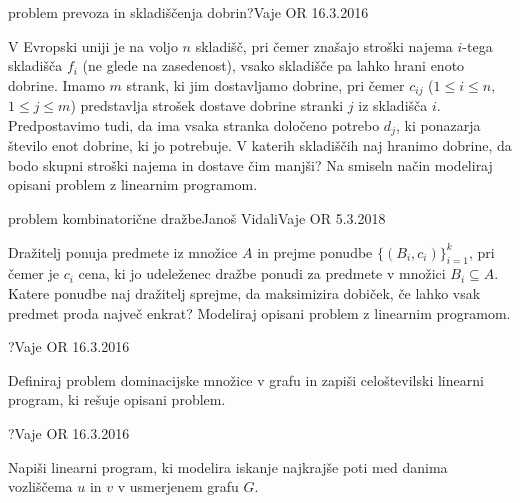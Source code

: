 \begin{naloga}{problem prevoza in skladiščenja dobrin}{?}{Vaje OR 16.3.2016}
\begin{vprasanje}
V Evropski uniji je na voljo $n$ skladišč,
pri čemer znašajo stroški najema $i$-tega skladišča $f_i$
(ne glede na zasedenost),
vsako skladišče pa lahko hrani enoto dobrine.
Imamo $m$ strank, ki jim dostavljamo dobrine,
pri čemer $c_{ij}$ ($1 \le i \le n$, $1 \le j \le m$)
predstavlja strošek dostave dobrine stranki $j$ iz skladišča $i$.
Predpostavimo tudi, da ima vsaka stranka določeno potrebo $d_j$,
ki ponazarja število enot dobrine, ki jo potrebuje.
V katerih skladiščih naj hranimo dobrine,
da bodo skupni stroški najema in dostave čim manjši?
Na smiseln način modeliraj opisani problem z linearnim programom.
\end{vprasanje}
\begin{odgovor}
\end{odgovor}
\end{naloga}


\begin{naloga}{problem kombinatorične dražbe}{Janoš Vidali}{Vaje OR 5.3.2018}
\begin{vprasanje}
Dražitelj ponuja predmete iz množice $A$
in prejme ponudbe $\{(B_i, c_i)\}_{i=1}^k$,
pri čemer je $c_i$ cena,
ki jo udeleženec dražbe ponudi za predmete v množici $B_i \subseteq A$.
Katere ponudbe naj dražitelj sprejme,
da maksimizira dobiček,
če lahko vsak predmet proda največ enkrat?
Modeliraj opisani problem z linearnim programom.
\end{vprasanje}
\begin{odgovor}
\end{odgovor}
\end{naloga}


\begin{naloga}{}{?}{Vaje OR 16.3.2016}
\begin{vprasanje}
Definiraj problem dominacijske množice v grafu
in zapiši celoštevilski linearni program,
ki rešuje opisani problem.
\end{vprasanje}
\begin{odgovor}
\end{odgovor}
\end{naloga}


\begin{naloga}{}{?}{Vaje OR 16.3.2016}
\begin{vprasanje}
Napiši linearni program,
ki modelira iskanje najkrajše poti
med danima vozliščema $u$ in $v$ v usmerjenem grafu $G$.
\end{vprasanje}
\begin{odgovor}
\end{odgovor}
\end{naloga}


